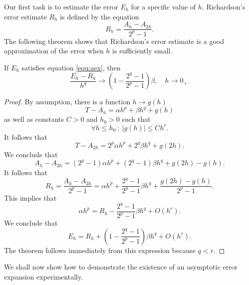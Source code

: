 \documentclass[runningheads]{llncs}
\begin{document}
Our first task is to estimate the error $E_h$ for a specific value of $h$. Richardson's error estimate $R_h$ is defined by the equation
\begin{equation}
 R_h =  \frac{A_h - A_{2h}}{2^p - 1}.
\end{equation}
The following theorem shows that Richardson's error estimate is a good approximation of the error when $h$ is sufficiently small.

\begin{theorem} If $E_h$ satisfies equation \eqref{equ:aex}, then
  \begin{equation}
    \frac{E_h - R_h}{h^q} \rightarrow  \left(1 - \frac{2^q-1}{2^p-1} \right) \beta, \quad h \rightarrow 0_+.
  \end{equation}
\end{theorem}
\begin{proof}
  By assumption, there is a function $h \rightarrow g(h)$ 
  \begin{equation}
    T - A_h  = \alpha h^p + \beta h^q + g(h)
  \end{equation}
  as well as constants $C>0$ and $h_0 > 0$ such that
  \begin{equation}
    \forall h \leq h_0 \: : \: |g(h)| \leq Ch^r.
  \end{equation}
  It follows that
  \begin{equation}
    T- A_{2h} = 2^p \alpha h^p + 2^q \beta h^q + g(2h).
  \end{equation}
  We conclude that
  \begin{equation} \label{equ:Dh:1}
    A_h - A_{2h} = (2^p - 1) \alpha h^p + (2^q - 1) \beta h^q + g(2h) - g(h).
  \end{equation}
  It follows that
  \begin{equation}
    R_h = \frac{A_h - A_{2h}}{2^p - 1} = \alpha h^p + \frac{2^q-1}{2^p-1} \beta h^q + \frac{g(2h)-g(h)}{2^p-1}.
  \end{equation}
  This implies that
  \begin{equation}
    \alpha h^p =  R_h - \frac{2^q-1}{2^p-1} \beta h^q + O(h^r).
  \end{equation}
  We conclude that
  \begin{equation}
    E_h = R_h + \left(1 - \frac{2^q-1}{2^p-1} \right) \beta h^q + O(h^r).
  \end{equation}
  The theorem follows immediately from this expression because $q < r$.
\end{proof}
We shall now show how to demonstrate the existence of an asymptotic error expansion experimentally.
\end{document}
